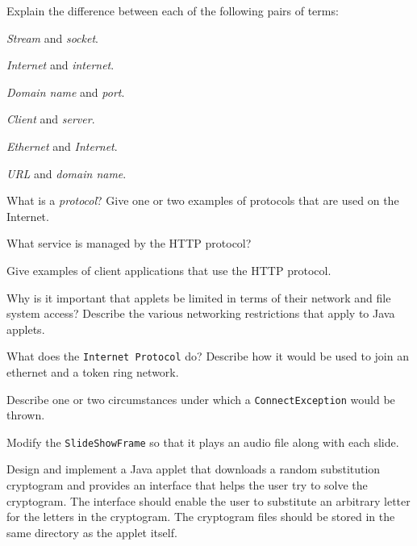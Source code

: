 \label{exercises}
\begin{EXRtwo}

\item  Explain the difference between each of the following pairs of terms:

\begin{EXRtwoLL}
\begin{multicols}{2}
\item  {\it Stream} and {\it socket}.
\item  {\it Internet} and {\it internet}.
\item  {\it Domain name} and {\it port}.
\item  {\it Client} and {\it server}.
\item  {\it Ethernet} and {\it Internet}.
\item  {\it URL} and {\it domain name}.
\end{multicols}
\end{EXRtwoLL}

\item  What is a {\it protocol}? Give one or two examples
of protocols that are used on the Internet.

\item  What service is managed by the HTTP protocol?

\item  Give examples of client applications that use
the HTTP \mbox{protocol.}

\item  Why is it important that applets be limited
in terms of their network and file system access?  Describe the various
networking restrictions that apply to Java applets.

\item  What does the {\tt Internet Protocol} do?  Describe
how it would be used to join an ethernet
and a token ring network.

\item  Describe one or two circumstances under which
a {\tt Connect\-Exception} would be thrown.

\item  Modify the {\tt SlideShowFrame} so that it plays
an audio file along with each slide.

\item  Design and implement a Java applet that downloads
a random substitution cryptogram and provides an interface that
helps the user try to solve the cryptogram.  The interface should
enable the user to substitute an arbitrary letter for the
letters in the cryptogram.  The cryptogram files should be
stored in the same directory as the applet itself.


\end{EXRtwo}
